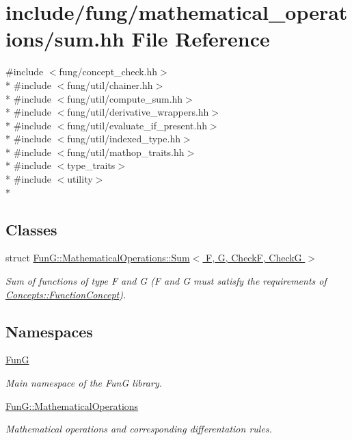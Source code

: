 \hypertarget{sum_8hh}{}\section{include/fung/mathematical\+\_\+operations/sum.hh File Reference}
\label{sum_8hh}
{\ttfamily \#include $<$fung/concept\+\_\+check.\+hh$>$}\\*
{\ttfamily \#include $<$fung/util/chainer.\+hh$>$}\\*
{\ttfamily \#include $<$fung/util/compute\+\_\+sum.\+hh$>$}\\*
{\ttfamily \#include $<$fung/util/derivative\+\_\+wrappers.\+hh$>$}\\*
{\ttfamily \#include $<$fung/util/evaluate\+\_\+if\+\_\+present.\+hh$>$}\\*
{\ttfamily \#include $<$fung/util/indexed\+\_\+type.\+hh$>$}\\*
{\ttfamily \#include $<$fung/util/mathop\+\_\+traits.\+hh$>$}\\*
{\ttfamily \#include $<$type\+\_\+traits$>$}\\*
{\ttfamily \#include $<$utility$>$}\\*
\subsection*{Classes}
\begin{DoxyCompactItemize}
\item 
struct \hyperlink{structFunG_1_1MathematicalOperations_1_1Sum}{Fun\+G\+::\+Mathematical\+Operations\+::\+Sum$<$ F, G, Check\+F, Check\+G $>$}
\begin{DoxyCompactList}\small\item\em Sum of functions of type F and G (F and G must satisfy the requirements of \hyperlink{structFunG_1_1Concepts_1_1FunctionConcept}{Concepts\+::\+Function\+Concept}). \end{DoxyCompactList}\end{DoxyCompactItemize}
\subsection*{Namespaces}
\begin{DoxyCompactItemize}
\item 
 \hyperlink{namespaceFunG}{FunG}
\begin{DoxyCompactList}\small\item\em Main namespace of the FunG library. \end{DoxyCompactList}\item 
 \hyperlink{namespaceFunG_1_1MathematicalOperations}{Fun\+G\+::\+Mathematical\+Operations}
\begin{DoxyCompactList}\small\item\em Mathematical operations and corresponding differentation rules. \end{DoxyCompactList}\end{DoxyCompactItemize}
